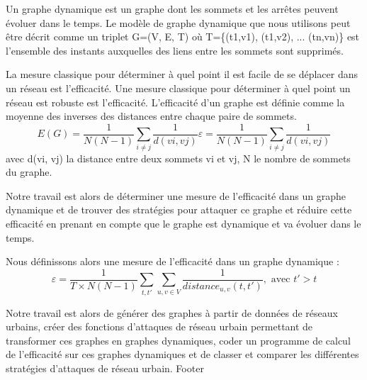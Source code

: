 Un graphe dynamique est un graphe dont les sommets et les arrêtes peuvent évoluer dans le temps.
Le modèle de graphe dynamique que nous utilisons peut être décrit comme un triplet G=(V, E, T) 
où T=\{(t1,v1), (t1,v2), ... (tn,vn)\} est l'ensemble des instants auxquelles des liens 
entre les sommets sont supprimés.


La mesure classique pour déterminer à quel point il est facile de se déplacer dans un réseau est l'efficacité.
Une mesure classique pour déterminer à quel point un réseau est robuste est l'efficacité\cite{efficiency}.
L'efficacité d'un graphe est définie comme la moyenne des inverses des distances entre chaque paire de sommets.
\begin{equation*}
    E(G) = \frac{1}{N(N-1)} \sum_{i \neq j} \frac{1}{d(vi, vj)}
    \varepsilon = \frac{1}{N(N-1)} \sum_{i \neq j} \frac{1}{d(vi, vj)}
\end{equation*}
avec d(vi, vj) la distance entre deux sommets vi et vj, N le nombre de sommets du graphe.

Notre travail est alors de déterminer une mesure de l'efficacité dans un graphe dynamique et de 
trouver des stratégies pour attaquer ce graphe et réduire cette efficacité en prenant en compte
que le graphe est dynamique et va évoluer dans le temps.

Nous définissons alors une mesure de l'efficacité dans un graphe dynamique :
\begin{equation*}
    \varepsilon = \frac{1}{T \times N(N-1)} \sum_{t,t'} \sum_{u,v \in V} \frac{1}{distance_{u,v}(t,t')}, \text{ avec } t' > t
\end{equation*}

Notre travail est alors de générer des graphes à partir de données de réseaux urbains, 
créer des fonctions d'attaques de réseau urbain permettant de transformer ces graphes en graphes dynamiques,
coder un programme de calcul de l'efficacité sur ces graphes dynamiques et de classer et comparer les 
différentes stratégies d'attaques de réseau urbain.
Footer
